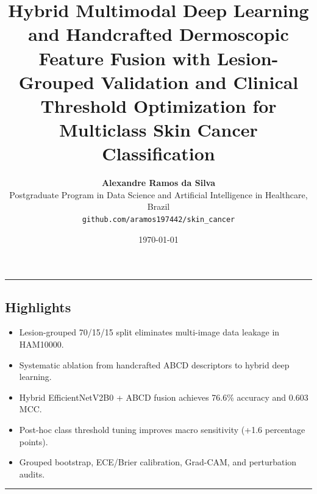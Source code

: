 \documentclass[11pt,a4paper]{article}
\title{\LARGE \textbf{Hybrid Multimodal Deep Learning and Handcrafted Dermoscopic Feature Fusion with Lesion-Grouped Validation and Clinical Threshold Optimization for Multiclass Skin Cancer Classification}}
\author{
    \textbf{Alexandre Ramos da Silva}\\[0.3em]
    \small Postgraduate Program in Data Science and Artificial Intelligence in Healthcare, Brazil\\
    \small \texttt{github.com/aramos197442/skin\_cancer}
}
\date{\today}
\begin{document}
\maketitle

\noindent\rule{\textwidth}{0.6pt}
\subsection*{Highlights}
\begin{itemize}
    \item Lesion-grouped 70/15/15 split eliminates multi-image data leakage in HAM10000.
    \item Systematic ablation from handcrafted ABCD descriptors to hybrid deep learning.
    \item Hybrid EfficientNetV2B0 + ABCD fusion achieves 76.6\% accuracy and 0.603 MCC.
    \item Post-hoc class threshold tuning improves macro sensitivity (+1.6 percentage points).
    \item Grouped bootstrap, ECE/Brier calibration, Grad-CAM, and perturbation audits.
\end{itemize}
\noindent\rule{\textwidth}{0.6pt}
\vspace{0.5em}
\end{document}
